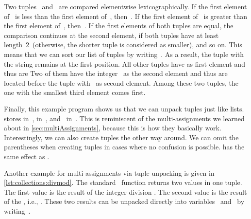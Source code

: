 Two tuples~ and~ are compared elementwise lexicographically.
If the first element of~ is less than the first element of~, then~.
If the first element of~ is greater than the first element of~, then~.
If the first elements of both tuples are equal, the comparison continues at the second element, if both tuples have at least length~2~(otherwise, the shorter tuple is considered as smaller), and so on.
This means that we can sort our list of tuples by writing~.
As a result, the tuple with the string  remains at the first position.
All other tuples have  as first element and thus are 
Two of them have the integer~ as the second element and thus are located before the tuple with~ as second element.
Among these two tuples, the one with the smallest third element comes first.

Finally, this example program shows us that we can unpack tuples just like lists.
 stores  in~,  in~, and~ in~.
This is reminiscent of the multi-assignments we learned about in \cref{sec:multiAssignments}, because this is how they basically work.
Interestingly, we can also create tuples the other way around.
We can omit the parentheses when creating tuples in cases where no confusion is possible.
 has the same effect as .

%
%

Another example for multi-assignments via tuple-unpacking is given in \cref{lst:collections:divmod}.
The standard \python\ function  returns two values in one tuple.
The first value is the result of the integer division\pythonIdx{//} .
The second value is the result of the , i.e., \pythonIdx{\%}.
These two results can be unpacked directly into variables~ and~ by writing~.

